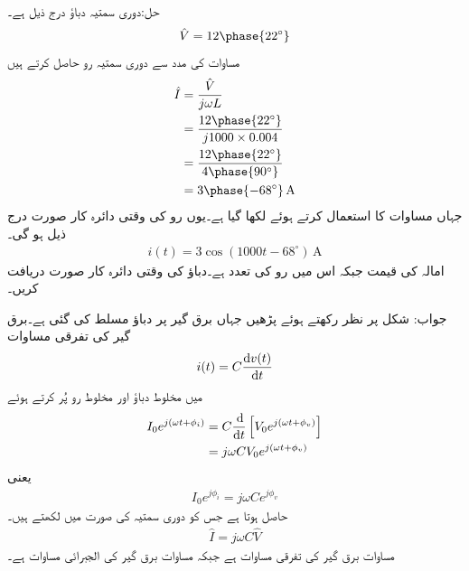 حل:دوری سمتیہ دباؤ درج ذیل ہے۔
\begin{align*}
\hat{V}=12\phase{22^{\circ}}
\end{align*}
مساوات  کی مدد سے دوری سمتیہ رو حاصل کرتے ہیں
\begin{align*}
\hat{I}&=\frac{\hat{V}}{j \omega L}\\
&=\frac{12\phase{22^{\circ}}}{j1000\times 0.004}\\
&=\frac{12\phase{22^{\circ}}}{4\phase{90^{\circ}}}\\
&=3\phase{-68^{\circ}} \, \si{\ampere}
\end{align*}
جہاں مساوات  کا استعمال کرتے ہوئے  لکھا گیا  ہے۔یوں رو کی وقتی دائرہ کار صورت درج ذیل ہو گی۔
\begin{align*}
i(t)=3\cos(1000t-68^{\circ}) \, \si{\ampere}
\end{align*}
امالہ کی قیمت  جبکہ اس میں رو  کی تعدد  ہے۔دباؤ کی وقتی دائرہ کار صورت دریافت کریں۔

جواب:
شکل  پر نظر رکھتے ہوئے پڑھیں جہاں برق گیر پر دباؤ  مسلط کی گئی ہے۔برق گیر کی تفرقی مساوات
\begin{align}\label{مساوات_بدلتا_برق_گیر_تفرقی_مساوات}
i(t)=C \frac{\dif v(t)}{\dif t}
\end{align}
میں مخلوط دباؤ اور مخلوط رو پُر کرتے ہوئے
\begin{align*}
I_0 e^{j(\omega t +\phi_i)}&=C \frac{\dif}{\dif t} \left[V_0 e^{j(\omega t +\phi_v)} \right]\\
&=j \omega C V_0 e^{j(\omega t +\phi_v)}
\end{align*}
یعنی
\begin{align*}
I_0 e^{j\phi_i}=j \omega C e^{j \phi_v}
\end{align*}
حاصل ہوتا ہے جس کو دوری سمتیہ کی صورت میں لکھتے ہیں۔
\begin{align}\label{مساوات_بدلتا_برق_گیر_دوری_مساوات_الف}
\hat{I}=j \omega C \hat{V}
\end{align}
مساوات  برق گیر کی تفرقی مساوات ہے جبکہ مساوات  برق گیر کی الجبرائی مساوات ہے۔
 
